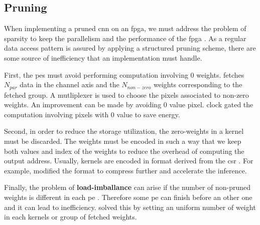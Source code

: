 \subsection{Pruning} \label{subsec:impl_prun}
%
%
When implementing a pruned \acrshort{cnn} on an \acrshort{fpga}, we must address the problem of sparsity to keep the parallelism and the performance of the \acrshort{fpga} \cite{zhu_efficient_2020}. As a regular data access pattern is assured by applying a structured pruning scheme, there are some source of inefficiency that an implementation must handle.

First, the \acrshort{pe}s must avoid performing computation involving 0 weights. \textcite{kang_accelerator-aware_2020} fetches $N_{par}$ data in the channel axis and the $N_{non-zero}$ weights corresponding to the fetched group. A mutliplexer is used to choose the pixels associated to non-zero weights. An improvement can be made by avoiding 0 value pixel. \textcite{zhu_efficient_2020} clock gated the computation involving pixels with 0 value to save energy.

Second, in order to reduce the storage utilization, the zero-weights in a kernel must be discarded. The weights must be encoded in such a way that we keep both values and index of the weights to reduce the overhead of computing the output address.  Usually, kernels are encoded in format derived from the \acrfull{csr} \cite{mao_exploring_2017}. For example, \cite{zhu_efficient_2020} modified the format to compress further and accelerate the inference.

Finally, the problem of \textbf{load-imballance} can arise if the number of non-pruned weights is different in each \acrshort{pe} \cite{kim_zena_2018}. Therefore some \acrshort{pe} can finish before an other one and it can lead to inefficiency. \textcite{zhu_efficient_2020, kang_accelerator-aware_2020} solved this by setting an uniform number of weight in each kernels or group of fetched weights.
